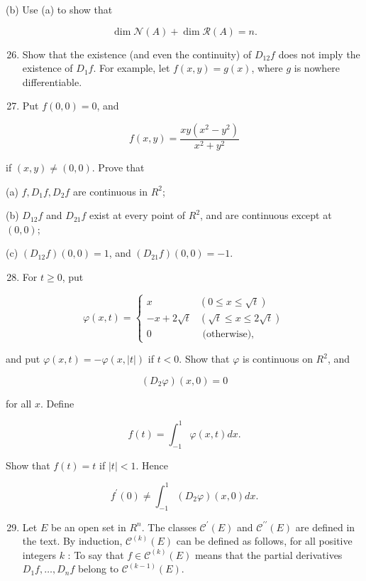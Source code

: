 \documentclass[10pt]{article}
\begin{document}
(b) Use (a) to show that

$$
\operatorname{dim} \mathscr{N}(A)+\operatorname{dim} \mathscr{R}(A)=n .
$$

\begin{enumerate}
  \setcounter{enumi}{25}
  \item Show that the existence (and even the continuity) of $D_{12} f$ does not imply the existence of $D_{1} f$. For example, let $f(x, y)=g(x)$, where $g$ is nowhere differentiable.

  \item Put $f(0,0)=0$, and

\end{enumerate}

$$
f(x, y)=\frac{x y\left(x^{2}-y^{2}\right)}{x^{2}+y^{2}}
$$

if $(x, y) \neq(0,0)$. Prove that

(a) $f, D_{1} f, D_{2} f$ are continuous in $R^{2}$;

(b) $D_{12} f$ and $D_{21} f$ exist at every point of $R^{2}$, and are continuous except at $(0,0)$;

(c) $\left(D_{12} f\right)(0,0)=1$, and $\left(D_{21} f\right)(0,0)=-1$.

\begin{enumerate}
  \setcounter{enumi}{27}
  \item For $t \geq 0$, put
\end{enumerate}

$$
\varphi(x, t)= \begin{cases}x & (0 \leq x \leq \sqrt{t}) \\ -x+2 \sqrt{t} & (\sqrt{t} \leq x \leq 2 \sqrt{t}) \\ 0 & \text { (otherwise), }\end{cases}
$$

and put $\varphi(x, t)=-\varphi(x,|t|)$ if $t<0$. Show that $\varphi$ is continuous on $R^{2}$, and

$$
\left(D_{2} \varphi\right)(x, 0)=0
$$

for all $x$. Define

$$
f(t)=\int_{-1}^{1} \varphi(x, t) d x .
$$

Show that $f(t)=t$ if $|t|<1$. Hence

$$
f^{\prime}(0) \neq \int_{-1}^{1}\left(D_{2} \varphi\right)(x, 0) d x .
$$

\begin{enumerate}
  \setcounter{enumi}{28}
  \item Let $E$ be an open set in $R^{n}$. The classes $\mathscr{C}^{\prime}(E)$ and $\mathscr{C}^{\prime \prime}(E)$ are defined in the text. By induction, $\mathscr{C}^{(k)}(E)$ can be defined as follows, for all positive integers $k$ : To say that $f \in \mathscr{C}^{(k)}(E)$ means that the partial derivatives $D_{1} f, \ldots, D_{n} f$ belong to $\mathscr{C}^{(k-1)}(E)$.
\end{enumerate}
\end{document}
